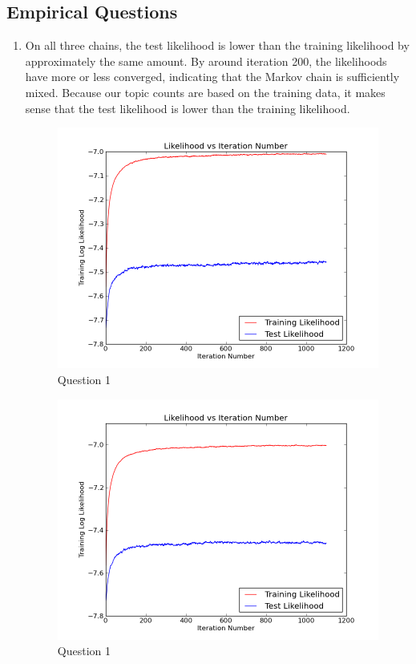 \documentclass[11pt,a4paper]{article}
\begin{document}
	\subsection{Empirical Questions}
	\begin{enumerate}
		\item On all three chains, the test likelihood is lower than the
		training likelihood by approximately the same amount. By around iteration
		200, the likelihoods have more or less converged, indicating that 
		the Markov chain is sufficiently mixed. Because our topic counts are
		based on the training data, it makes sense that the test likelihood is lower
		than the training likelihood.
			\begin{figure}[H]
				\caption{Question 1}
				\begin{center}
					\includegraphics[scale=0.5]{../train_test_1}
				\end{center}
			\end{figure}
			\begin{figure}[H]
				\caption{Question 1}
				\begin{center}
					\includegraphics[scale=0.5]{../train_test_2}

\end{center}
\end{figure}
\end{enumerate}
\end{document}
